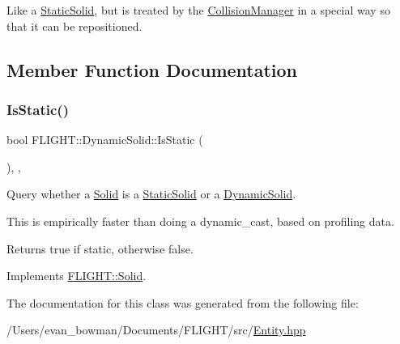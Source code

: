 Like a \hyperlink{class_f_l_i_g_h_t_1_1_static_solid}{Static\+Solid}, but is treated by the \hyperlink{class_f_l_i_g_h_t_1_1_collision_manager}{Collision\+Manager} in a special way so that it can be repositioned. 

\subsection{Member Function Documentation}
\mbox{\label{class_f_l_i_g_h_t_1_1_dynamic_solid_a39451b0ef449a343cf5f9c12e3f79ba3}} 
\subsubsection{\texorpdfstring{Is\+Static()}{IsStatic()}}
{\footnotesize\ttfamily bool F\+L\+I\+G\+H\+T\+::\+Dynamic\+Solid\+::\+Is\+Static (\begin{DoxyParamCaption}{ }\end{DoxyParamCaption})\hspace{0.3cm}{\ttfamily [inline]}, {\ttfamily [final]}, {\ttfamily [virtual]}}



Query whether a \hyperlink{class_f_l_i_g_h_t_1_1_solid}{Solid} is a \hyperlink{class_f_l_i_g_h_t_1_1_static_solid}{Static\+Solid} or a \hyperlink{class_f_l_i_g_h_t_1_1_dynamic_solid}{Dynamic\+Solid}. 

This is empirically faster than doing a dynamic\+\_\+cast, based on profiling data. \begin{DoxyReturn}{Returns}
true if static, otherwise false. 
\end{DoxyReturn}


Implements \hyperlink{class_f_l_i_g_h_t_1_1_solid_afcaa25bff89717d44a822723682a63f8}{F\+L\+I\+G\+H\+T\+::\+Solid}.



The documentation for this class was generated from the following file\+:\begin{DoxyCompactItemize}
\item 
/\+Users/evan\+\_\+bowman/\+Documents/\+F\+L\+I\+G\+H\+T/src/\hyperlink{_entity_8hpp}{Entity.\+hpp}\end{DoxyCompactItemize}
